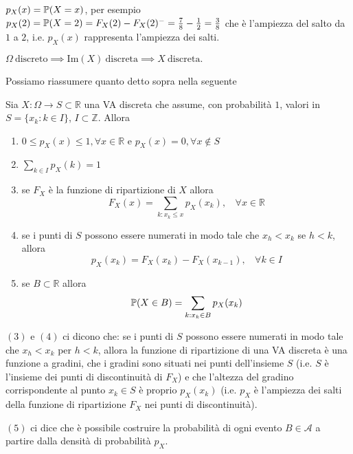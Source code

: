 $p_{X}( x) =\mathbb{P}( X=x)$, per esempio $p_{X}( 2) =\mathbb{P}( X=2) =F_{X}( 2) -F_{X}( 2)^{-} =\frac{7}{8} -\frac{1}{2} =\frac{3}{8}$ che è l'ampiezza del salto da $1$ a $2$, i.e. $p_{X}( x)$ rappresenta l'ampiezza dei salti.
\begin{oss}
$\Omega \ \text{discreto} \implies \mathrm{Im}( X) \ \text{discreta} \implies X\ \text{discreta} .$
\end{oss}
Possiamo riassumere quanto detto sopra nella seguente
\begin{theorem}
Sia $X:\Omega \rightarrow S\subset \mathbb{R}$ una VA discreta che assume, con probabilità $1$, valori in $S=\{x_{k} :k\in I\}$, $I\subset \mathbb{Z}$. Allora
\end{theorem}
\begin{enumerate}
\item $0\leq p_{X}( x) \leq 1,\forall x\in \mathbb{R}$ e $p_{X}( x) =0,\forall x\notin S$
\item $\sum\limits _{k\in I} p_{X}( k) =1$
\item se $F_{X}$ è la funzione di ripartizione di $X$ allora
\begin{equation*}
F_{X}( x) =\sum\limits _{k:x_{k} \leq x} p_{X}( x_{k}) ,\ \ \ \ \forall x\in \mathbb{R}
\end{equation*}
\item se i punti di $S$ possono essere numerati in modo tale che $x_{h} < x_{k}$ se $h< k$, allora
\begin{equation*}
p_{X}( x_{k}) =F_{X}( x_{k}) -F_{X}( x_{k-1}) ,\ \ \ \ \forall k\in I
\end{equation*}
\item se $B\subset \mathbb{R}$ allora
\begin{equation*}
\mathbb{P}( X\in B) =\sum\limits _{k:x_{k} \in B} p_{X}( x_{k})
\end{equation*}
\end{enumerate}
\begin{oss}
$( 3)$ e $( 4)$ ci dicono che: se i punti di $S$ possono essere numerati in modo tale che $x_{h} < x_{k}$ per $h< k$, allora la funzione di ripartizione di una VA discreta è una funzione a gradini, che i gradini sono situati nei punti dell'insieme $S$ (i.e. $S$ è l'insieme dei punti di discontinuità di $F_{X}$) e che l'altezza del gradino corrispondente al punto $x_{k} \in S$ è proprio $p_{X}( x_{k})$ (i.e. $p_{X}$ è l'ampiezza dei salti della funzione di ripartizione $F_{X}$ nei punti di discontinuità).

$( 5)$ ci dice che è possibile costruire la probabilità di ogni evento $B\in \mathcal{A}$ a partire dalla densità di probabilità $p_{X}$.
\end{oss}

